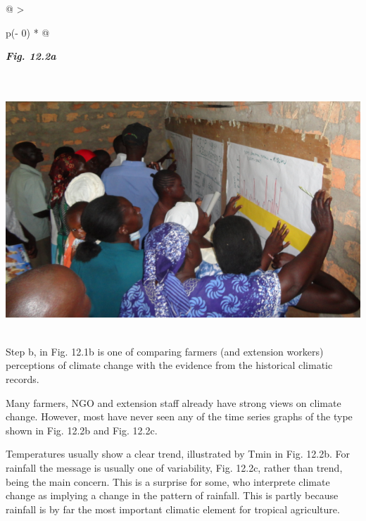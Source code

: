 \documentclass[
  letterpaper,
  DIV=11,
  numbers=noendperiod]{scrreprt}
\begin{document}
\begin{longtable}[]{@{}
  >{\raggedright\arraybackslash}p{(\columnwidth - 0\tabcolsep) * }@{}}
\toprule\noalign{}
\begin{minipage}[b]{\linewidth}\raggedright
\textbf{\emph{Fig. 12.2a}}
\end{minipage} \\
\midrule\noalign{}
\endhead
\bottomrule\noalign{}
\endlastfoot
\includegraphics[width=5.95727in,height=3.62281in]{figures/Fig12.2a.png} \\
\end{longtable}

Step b, in Fig. 12.1b is one of comparing farmers (and extension
workers) perceptions of climate change with the evidence from the
historical climatic records.

Many farmers, NGO and extension staff already have strong views on
climate change. However, most have never seen any of the time series
graphs of the type shown in Fig. 12.2b and Fig. 12.2c.

Temperatures usually show a clear trend, illustrated by Tmin in Fig.
12.2b. For rainfall the message is usually one of variability, Fig.
12.2c, rather than trend, being the main concern. This is a surprise for
some, who interprete climate change as implying a change in the pattern
of rainfall. This is partly because rainfall is by far the most
important climatic element for tropical agriculture.
\end{document}

